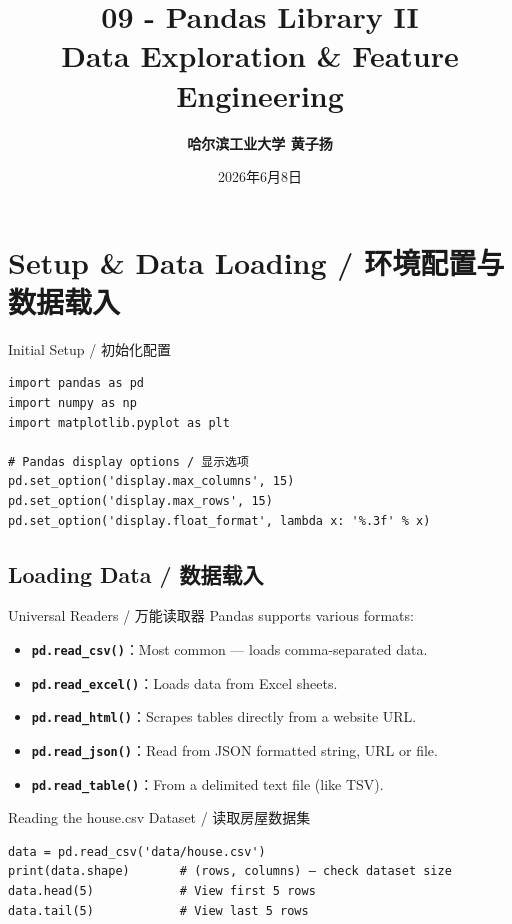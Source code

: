 \documentclass[11pt,a4paper]{article}
\title{\Huge \bfseries 09 - Pandas Library II \\ Data Exploration \& Feature Engineering}
\author{\Large \textbf{哈尔滨工业大学 \quad 黄子扬}}
\date{2026年6月8日}
\begin{document}
\maketitle
\tableofcontents
\newpage

\section{Setup \& Data Loading / 环境配置与数据载入}

\begin{examplebox}{Initial Setup / 初始化配置}
\begin{lstlisting}
import pandas as pd
import numpy as np
import matplotlib.pyplot as plt

# Pandas display options / 显示选项
pd.set_option('display.max_columns', 15)
pd.set_option('display.max_rows', 15)
pd.set_option('display.float_format', lambda x: '%.3f' % x)
\end{lstlisting}
\end{examplebox}

\subsection{Loading Data / 数据载入}

\begin{concept}{Universal Readers / 万能读取器}
    Pandas supports various formats:
    \begin{itemize}[itemsep=0.3em]
        \item \textbf{\texttt{pd.read\_csv()}}：Most common — loads comma-separated data.
        \item \textbf{\texttt{pd.read\_excel()}}：Loads data from Excel sheets.
        \item \textbf{\texttt{pd.read\_html()}}：Scrapes tables directly from a website URL.
        \item \textbf{\texttt{pd.read\_json()}}：Read from JSON formatted string, URL or file.
        \item \textbf{\texttt{pd.read\_table()}}：From a delimited text file (like TSV).
    \end{itemize}
\end{concept}

\begin{examplebox}{Reading the house.csv Dataset / 读取房屋数据集}
\begin{lstlisting}
data = pd.read_csv('data/house.csv')
print(data.shape)       # (rows, columns) — check dataset size
data.head(5)            # View first 5 rows
data.tail(5)            # View last 5 rows
\end{lstlisting}
\end{examplebox}
\end{document}
